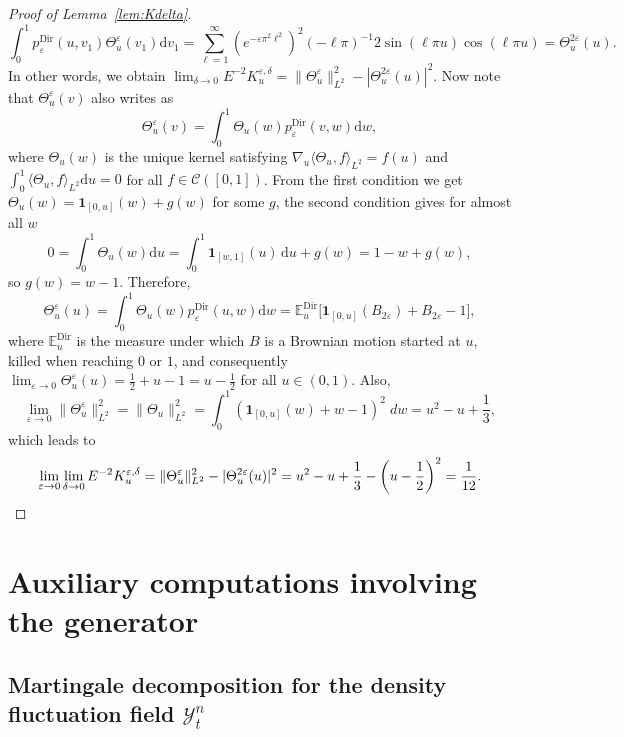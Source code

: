 \documentclass[10pt]{amsart}
\theoremstyle{definition}\newtheorem{defi}[theo]{Definition}\newtheorem{rema}[theo]{Remark}\newtheorem{exam}[theo]{Example}\newtheorem{exem}[theo]{Example}\newtheorem{nota}[theo]{Notation}
\DeclareMathOperator{\Dir}{Dir}
\newcommand{\mc}[1]{{\mathcal #1}}
\renewcommand{\mc}[1]{{\mathcal #1}}
\newcommand*{\dd}{\mathrm{d}}
\newcommand*{\du}{\dd u}
\newcommand*{\dv}{\dd v}
\newcommand*{\dw}{\dd w}
\renewcommand{\tfrac}{\frac}
\begin{document}
\begin{proof}[Proof of Lemma~\ref{lem:Kdelta}]
\[
\int_0^1 p^{\Dir}_{\varepsilon} (u, v_1) \Theta^{\varepsilon}_u (v_1) \dv_1 = \sum_{\ell = 1}^{\infty} (e^{- \varepsilon \pi^2 \ell^2})^2 (- \ell\pi)^{- 1} 2 \sin (\ell \pi u) \cos (\ell \pi u) = \Theta^{2\varepsilon}_u (u).
\]
In other words, we obtain $\lim_{\delta \rightarrow 0} E^{- 2} K^{\varepsilon, \delta}_u = \| \Theta^{\varepsilon}_u \|_{L^2}^2 - |\Theta^{2 \varepsilon}_u (u) |^2$. Now note that $\Theta^{\varepsilon}_u (v)$ also writes as
\[
\Theta^\varepsilon_u(v) = \int_0^1 \Theta_u (w) p^{\Dir}_{\varepsilon} (v, w) \dw,
\]
where $\Theta_u (w)$ is the unique kernel satisfying $\nabla_u \langle \Theta_u, f \rangle_{L^2} = f (u)$ and $\int_0^1 \langle
\Theta_u, f \rangle_{L^2} \du = 0$ for all $f \in \mc C([0,1])$. From the first condition we get $\Theta_u (w) =\mathbf{1}_{[0, u]} (w) + g(w)$ for some $g$, the second condition gives for almost all $w$
\[
0 = \int_0^1 \Theta_u (w) \du = \int_0^1 \mathbf{1}_{[w,1]}(u)\,\du + g(w) = 1 - w + g(w),
\]
so $g (w) = w - 1$. Therefore,
\[
\Theta^{\varepsilon}_u (u) = \int_0^1 \Theta_u (w) p^{\Dir}_{\varepsilon} (u, w) \dw =\mathbb{E}_u^{\Dir} \big[\mathbf{1}_{[0, u]} (B_{2 \varepsilon}) + B_{2 \varepsilon} - 1\big],
\]
where $\mathbb{E}^{\Dir}_u$ is the measure under which $B$ is a Brownian motion started at $u$, killed when reaching $0$ or $1$, and consequently $\lim_{\varepsilon \rightarrow 0} \Theta^{\varepsilon}_u (u) = \frac{1}{2} + u - 1 = u - \frac{1}{2}$ for all $u \in (0,1)$. Also,
\begin{equation*}
\lim_{\varepsilon \rightarrow 0} \| \Theta^{\varepsilon}_u \|_{L^2}^2 = \|
\Theta_u \|_{L^2}^2 = \int_0^1 (\mathbf{1}_{[0, u]} (w) + w - 1)^2 \; dw = u^2 - u + \tfrac{1}{3},
\end{equation*}
which leads to
\[
\lim_{\varepsilon \rightarrow 0} \lim_{\delta \rightarrow 0} E^{- 2} K^{\varepsilon, \delta}_u = \| \Theta^{\varepsilon}_u\|_{L^2}^2 - |
\Theta^{2 \varepsilon}_u (u) |^2 = u^2 - u + \tfrac{1}{3} - \left(u -
\tfrac{1}{2} \right)^2 = \tfrac{1}{12}.\qedhere
\]
\end{proof}

\appendix
\section{Auxiliary computations involving the generator}\label{sec:app}

\subsection{Martingale decomposition for the density fluctuation field \texorpdfstring{$\mc Y_t^n$}{Ytn}}\label{app:mart-dens}
\end{document}
